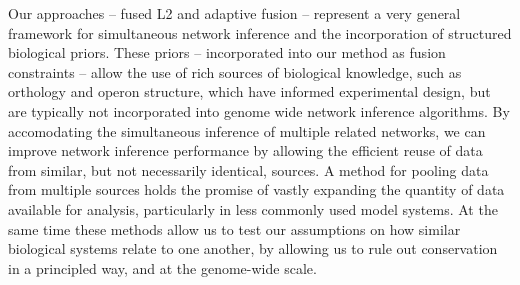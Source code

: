 \documentclass[11pt]{article}
\begin{document}
Our approaches -- fused L2 and adaptive fusion -- represent a very general framework for simultaneous network inference and the incorporation of structured biological priors. These priors -- incorporated into our method as fusion constraints -- allow the use of rich sources of biological knowledge, such as orthology and operon structure, which have informed experimental design, but are typically not incorporated into genome wide network inference algorithms. By accomodating the simultaneous inference of multiple related networks, we can improve network inference performance by allowing the efficient reuse of data from similar, but not necessarily identical, sources. A method for pooling data from multiple sources holds the promise of vastly expanding the quantity of data available for analysis, particularly in less commonly used model systems. At the same time these methods allow us to test our assumptions on how similar biological systems relate to one another, by allowing us to rule out conservation in a principled way, and at the genome-wide scale. 






\end{document}
